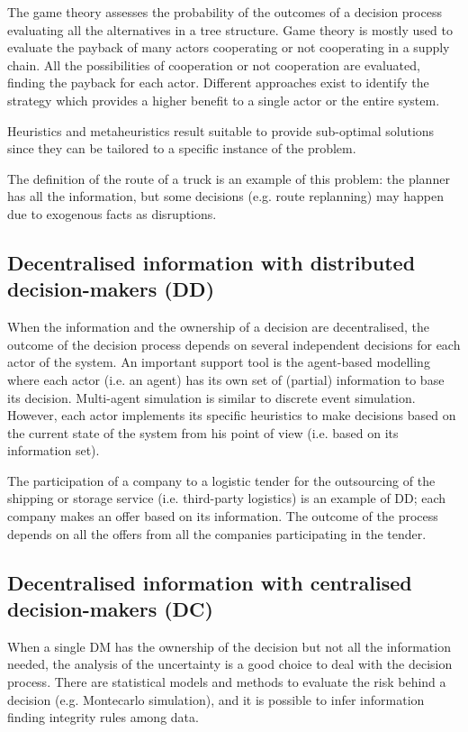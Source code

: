 The game theory assesses the probability of the outcomes of a decision process evaluating all the alternatives in a tree structure. Game theory is mostly used to evaluate the payback of many actors cooperating or not cooperating in a supply chain. All the possibilities of cooperation or not cooperation are evaluated, finding the payback for each actor. Different approaches exist to identify the strategy which provides a higher benefit to a single actor or the entire system.\par

Heuristics and metaheuristics result suitable to provide sub-optimal solutions since they can be tailored to a specific instance of the problem.\par

The definition of the route of a truck is an example of this problem: the planner has all the information, but some decisions (e.g. route replanning) may happen due to exogenous facts as disruptions. 

\subsection{Decentralised information with distributed decision-makers (DD)}

When the information and the ownership of a decision are decentralised, the outcome of the decision process depends on several independent decisions for each actor of the system. An important support tool is the agent-based modelling where each actor (i.e. an agent) has its own set of (partial) information to base its decision. Multi-agent simulation is similar to discrete event simulation. However, each actor implements its specific heuristics to make decisions based on the current state of the system from his point of view (i.e. based on its information set). \par

The participation of a company to a logistic tender for the outsourcing of the shipping or storage service (i.e. third-party logistics) is an example of DD; each company makes an offer based on its information. The outcome of the process depends on all the offers from all the companies participating in the tender.

\subsection{Decentralised information with centralised decision-makers (DC)}
When a single DM has the ownership of the decision but not all the information needed, the analysis of the uncertainty is a good choice to deal with the decision process. There are statistical models and methods to evaluate the risk behind a decision (e.g. Montecarlo simulation), and it is possible to infer information finding integrity rules among data. \par


